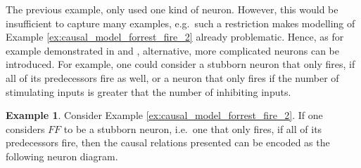 \documentclass[11pt,a4paper]{book}
\theoremstyle{definition}
\theoremstyle{definition}
\newtheorem{example}{Example}[section]
\theoremstyle{definition}
\theoremstyle{remark}
\newcommand{\cbinfoos}{\mathbb{F}_{\mathbb{B}}}
\begin{document}
The previous example, only used one kind of neuron. However, this would be insufficient to capture many examples, e.g.\ such a restriction makes modelling of Example \ref{ex:causal_model_forrest_fire_2} already problematic.
Hence, as for example demonstrated in \cite{hitchcock2009structural} and \cite{baumgartner2013regularity}, alternative, more complicated neurons can be introduced. For example, one could consider a stubborn neuron that only fires, if all of its predecessors fire as well, or a neuron that only fires if the number of stimulating inputs is greater that the number of inhibiting inputs.

\begin{example}
Consider Example \ref{ex:causal_model_forrest_fire_2}. If one considers $\mathit{FF}$ to be a stubborn neuron, i.e.\ one that only fires, if all of its predecessors fire, then the causal relations presented can be encoded as the following neuron diagram.
\begin{center}
\end{center}
\end{example}

%
\end{document}
